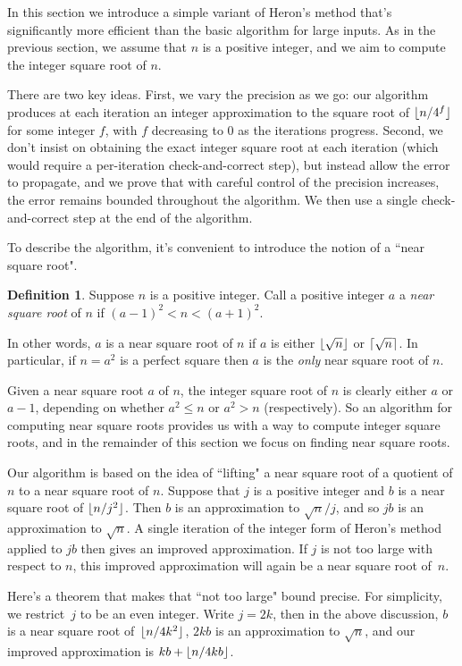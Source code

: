 \documentclass[a4paper]{article}
\DeclarePairedDelimiter\floor{\lfloor}{\rfloor}
\DeclarePairedDelimiter\ceil{\lceil}{\rceil}
\theoremstyle{plain}
\theoremstyle{definition}
\newtheorem{definition}[theorem]{Definition}
\begin{document}
In this section we introduce a simple variant of Heron's method that's
significantly more efficient than the basic algorithm for large inputs. As in
the previous section, we assume that $n$ is a positive integer, and we aim to
compute the integer square root of $n$.

There are two key ideas. First, we vary the precision as we go: our algorithm
produces at each iteration an integer approximation to the square root of
$\floor{n/4^f}$ for some integer $f$, with $f$ decreasing to $0$ as the
iterations progress. Second, we don't insist on obtaining the exact integer
square root at each iteration (which would require a per-iteration
check-and-correct step), but instead allow the error to propagate, and we prove
that with careful control of the precision increases, the error remains bounded
throughout the algorithm. We then use a single check-and-correct step
at the end of the algorithm.

To describe the algorithm, it's convenient to introduce the notion of a
``near square root".

\begin{definition}
  Suppose $n$ is a positive integer. Call a positive integer $a$ a
  \emph{near square root} of $n$ if $(a - 1)^2 < n < (a + 1)^2$.
\end{definition}

In other words, $a$ is a near square root of $n$ if $a$ is either $\floor{\sqrt
n}$ or $\ceil{\sqrt n}$. In particular, if $n = a^2$ is a perfect square then
$a$ is the \emph{only} near square root of $n$.

Given a near square root $a$ of $n$, the integer square root of $n$ is clearly
either $a$ or $a-1$, depending on whether $a^2 \le n$ or $a^2 > n$
(respectively). So an algorithm for computing near square roots provides us
with a way to compute integer square roots, and in the remainder of this
section we focus on finding near square roots.

Our algorithm is based on the idea of ``lifting" a near square root of a
quotient of $n$ to a near square root of $n$. Suppose that $j$ is a positive
integer and $b$ is a near square root of $\floor{n / j^2}$. Then $b$ is an
approximation to $\sqrt n / j$, and so $jb$ is an approximation to $\sqrt n$. A
single iteration of the integer form of Heron's method applied to $jb$ then
gives an improved approximation. If $j$ is not too large with respect to $n$,
this improved approximation will again be a near square root of~$n$.

Here's a theorem that makes that ``not too large" bound precise. For
simplicity, we restrict~$j$ to be an even integer. Write $j = 2k$, then in the
above discussion, $b$ is a near square root of~$\floor{n / 4k^2}$, $2kb$ is an
approximation to $\sqrt n$, and our improved approximation is $kb + \floor{n /
4kb}$.
\end{document}
